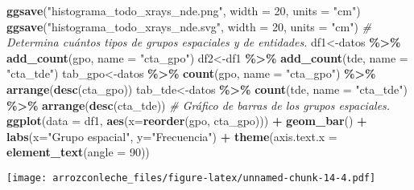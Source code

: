 \documentclass[
]{book}
\newenvironment{Shaded}{\begin{snugshade}}{\end{snugshade}}
\newcommand{\CommentTok}[1]{\textcolor[rgb]{0.56,0.35,0.01}{\textit{#1}}}
\newcommand{\DataTypeTok}[1]{\textcolor[rgb]{0.13,0.29,0.53}{#1}}
\newcommand{\DecValTok}[1]{\textcolor[rgb]{0.00,0.00,0.81}{#1}}
\newcommand{\KeywordTok}[1]{\textcolor[rgb]{0.13,0.29,0.53}{\textbf{#1}}}
\newcommand{\NormalTok}[1]{#1}
\newcommand{\OperatorTok}[1]{\textcolor[rgb]{0.81,0.36,0.00}{\textbf{#1}}}
\newcommand{\StringTok}[1]{\textcolor[rgb]{0.31,0.60,0.02}{#1}}
\begin{document}
\begin{Shaded}
\begin{Highlighting}[]
\KeywordTok{ggsave}\NormalTok{(}\StringTok{"histograma\_todo\_xrays\_nde.png"}\NormalTok{, }\DataTypeTok{width =} \DecValTok{20}\NormalTok{, }\DataTypeTok{units =} \StringTok{"cm"}\NormalTok{)}
\KeywordTok{ggsave}\NormalTok{(}\StringTok{"histograma\_todo\_xrays\_nde.svg"}\NormalTok{, }\DataTypeTok{width =} \DecValTok{20}\NormalTok{, }\DataTypeTok{units =} \StringTok{"cm"}\NormalTok{)}
\CommentTok{\# Determina cuántos tipos de grupos espaciales y de entidades.}
\NormalTok{df1\textless{}{-}datos }\OperatorTok{\%\textgreater{}\%}
\StringTok{  }\KeywordTok{add\_count}\NormalTok{(gpo, }\DataTypeTok{name =} \StringTok{"cta\_gpo"}\NormalTok{)}
\NormalTok{df2\textless{}{-}df1 }\OperatorTok{\%\textgreater{}\%}
\StringTok{  }\KeywordTok{add\_count}\NormalTok{(tde, }\DataTypeTok{name =} \StringTok{"cta\_tde"}\NormalTok{)}
\NormalTok{tab\_gpo\textless{}{-}datos }\OperatorTok{\%\textgreater{}\%}
\StringTok{  }\KeywordTok{count}\NormalTok{(gpo, }\DataTypeTok{name =} \StringTok{"cta\_gpo"}\NormalTok{) }\OperatorTok{\%\textgreater{}\%}
\StringTok{  }\KeywordTok{arrange}\NormalTok{(}\KeywordTok{desc}\NormalTok{(cta\_gpo))}
\NormalTok{tab\_tde\textless{}{-}datos }\OperatorTok{\%\textgreater{}\%}
\StringTok{  }\KeywordTok{count}\NormalTok{(tde, }\DataTypeTok{name =} \StringTok{"cta\_tde"}\NormalTok{) }\OperatorTok{\%\textgreater{}\%}
\StringTok{  }\KeywordTok{arrange}\NormalTok{(}\KeywordTok{desc}\NormalTok{(cta\_tde))}
\CommentTok{\# Gráfico de barras de los grupos espaciales.}
\KeywordTok{ggplot}\NormalTok{(}\DataTypeTok{data =}\NormalTok{ df1, }\KeywordTok{aes}\NormalTok{(}\DataTypeTok{x=}\KeywordTok{reorder}\NormalTok{(gpo, cta\_gpo))) }\OperatorTok{+}\StringTok{ }\KeywordTok{geom\_bar}\NormalTok{() }\OperatorTok{+}\StringTok{ }\KeywordTok{labs}\NormalTok{(}\DataTypeTok{x=}\StringTok{"Grupo espacial"}\NormalTok{, }\DataTypeTok{y=}\StringTok{"Frecuencia"}\NormalTok{) }\OperatorTok{+}\StringTok{ }\KeywordTok{theme}\NormalTok{(}\DataTypeTok{axis.text.x =} \KeywordTok{element\_text}\NormalTok{(}\DataTypeTok{angle =} \DecValTok{90}\NormalTok{))}
\end{Highlighting}
\end{Shaded}

\texttt{[image: arrozconleche\_files/figure-latex/unnamed-chunk-14-4.pdf]}
\end{document}
